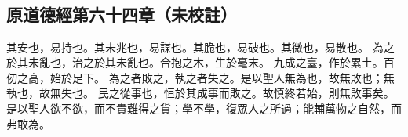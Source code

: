 ﻿%
%

\chapter{~}

\section{原道德經第六十四章（未校註）}

\begin{withgezhu}

\zhsong


其安也，易持也。其未兆也，易謀也。其脆也，易破也。其微也，易散也。
為之於其未亂也，治之於其未亂也。合抱之木，生於毫末。
九成之臺，作於累土。\textcolor{tongjia-color}{百仞之高，始於足下}。
為之者敗之，執之者失之。是以聖人無為也，故無敗也；無執也，故無失也。
民之從事也，恒於其成事而敗之。故慎終若始，則無敗事矣。
是以聖人欲不欲，而不貴難得之貨；學不學，復眾人之所過；能輔萬物之自然，而弗敢為。

\end{withgezhu}
